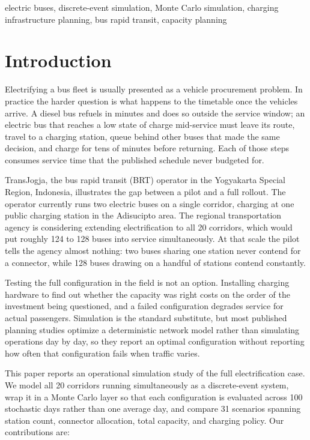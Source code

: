\documentclass[conference]{IEEEtran}
\begin{document}
\begin{IEEEkeywords}
electric buses, discrete-event simulation, Monte Carlo simulation,
charging infrastructure planning, bus rapid transit, capacity planning
\end{IEEEkeywords}

\section{Introduction}

Electrifying a bus fleet is usually presented as a vehicle procurement
problem. In practice the harder question is what happens to the timetable
once the vehicles arrive. A diesel bus refuels in minutes and does so
outside the service window; an electric bus that reaches a low state of
charge mid-service must leave its route, travel to a charging station,
queue behind other buses that made the same decision, and charge for tens
of minutes before returning. Each of those steps consumes service time
that the published schedule never budgeted for.

TransJogja, the bus rapid transit (BRT) operator in the Yogyakarta Special
Region, Indonesia, illustrates the gap between a pilot and a full
rollout. The operator currently runs two electric buses on a single
corridor, charging at one public charging station in the Adisucipto
area. The regional transportation agency is considering extending
electrification to all 20 corridors, which would put roughly 124 to 128
buses into service simultaneously. At that scale the pilot tells the
agency almost nothing: two buses sharing one station never contend for a
connector, while 128 buses drawing on a handful of stations contend
constantly.

Testing the full configuration in the field is not an option. Installing
charging hardware to find out whether the capacity was right costs on the
order of the investment being questioned, and a failed configuration
degrades service for actual passengers. Simulation is the standard
substitute, but most published planning studies optimize a deterministic
network model rather than simulating operations day by day, so they
report an optimal configuration without reporting how often that
configuration fails when traffic varies.

This paper reports an operational simulation study of the full
electrification case. We model all 20 corridors running simultaneously as
a discrete-event system, wrap it in a Monte Carlo layer so that each
configuration is evaluated across 100 stochastic days rather than one
average day, and compare 31 scenarios spanning station count, connector
allocation, total capacity, and charging policy. Our contributions are:
\end{document}
